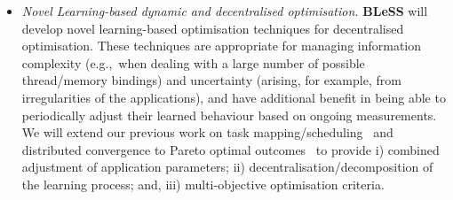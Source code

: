 \documentclass[a4paper,11pt]{article}
\newcommand{\project}[1]{\textbf{#1}\xspace}
\newcommand{\BLESS}{\project{BLeSS}}
\newcommand{\TheProject}{\BLESS}
\begin{document}
\begin{itemize}
\item \emph{Novel Learning-based dynamic and decentralised optimisation.} 
\TheProject will develop novel learning-based optimisation techniques for decentralised optimisation. These techniques are appropriate for managing information complexity (e.g.,~when dealing with a large number of possible thread/memory bindings) and uncertainty (arising, for example, from irregularities of the applications), and have additional benefit in being able to periodically adjust their learned behaviour based on ongoing measurements. We will extend our previous work on task mapping/scheduling~\cite{chasparis_design_2016,chasparis_pinning_applications_2017} 
and distributed convergence to Pareto optimal outcomes~\cite{ChasparisAriShamma13_SIAM,ChasparisShammaRantzer15}
to provide i) combined adjustment of application parameters; ii) 
decentralisation/decomposition of the learning process; and, 
iii) multi-objective optimisation criteria. 


\end{itemize}
\end{document}
